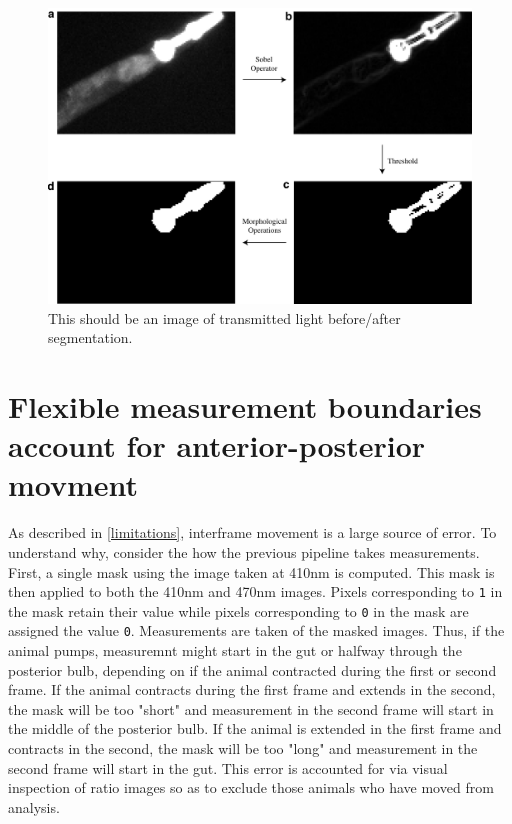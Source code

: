 \begin{figure}[ht]
    \centering
    \includegraphics[scale=.40]{Figures/rendered_files/sobel}
    \decoRule
    \caption[Overview of the improved segmentation algorithm]{This should be an image of transmitted light before/after segmentation.}
    \label{fig:TLSeg}
\end{figure}

\section{Flexible measurement boundaries account for anterior-posterior movment} \label{channelSegmentation}

As described in \ref{limitations}, interframe movement is a large source of error. To understand why, consider the how the previous pipeline takes measurements. First, a single mask using the image taken at 410nm is computed. This mask is then applied to both the 410nm and 470nm images. Pixels corresponding to \texttt{1} in the mask retain their value while pixels corresponding to \texttt{0} in the mask are assigned the value \texttt{0}. Measurements are taken of the masked images. Thus, if the animal pumps, measuremnt might start in the gut or halfway through the posterior bulb, depending on if the animal contracted during the first or second frame. If the animal contracts during the first frame and extends in the second, the mask will be too "short" and measurement in the second frame will start in the middle of the posterior bulb. If the animal is extended in the first frame and contracts in the second, the mask will be too "long" and measurement in the second frame will start in the gut. This error is accounted for via visual inspection of ratio images so as to exclude those animals who have moved from analysis.

